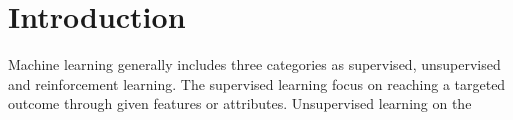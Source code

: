 \section{Introduction}

Machine learning generally includes three categories as supervised, unsupervised and reinforcement learning. The supervised learning focus on reaching a targeted outcome through given features or attributes. Unsupervised learning on the 
